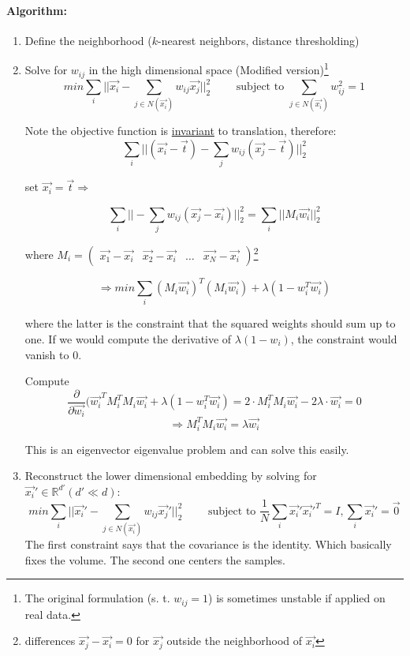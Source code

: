 \paragraph{Algorithm:}
\begin{enumerate}
    \item Define the neighborhood (\(k\)-nearest neighbors, distance thresholding)

    \item Solve for \(w_{ij}\) in the high dimensional space (Modified version)\footnote{The original formulation (s. t. $ w_{ij} = 1$) is sometimes unstable if applied on real data.}
        \[min \sum_{i}||\vec{x_i} - \sum_{j\in N(\vec{x_i})} w_{ij} \vec{x_j}||_2^2 \qquad \text{ subject to } \sum_{j \in N(\vec{x_i})} w_{ij}^2 = 1\]


        Note the objective function is \underline{invariant} to translation, therefore:
        \begin{equation*}
            \sum_{i} ||(\vec{x_i} - \vec{t}) - \sum_j w_{ij} (\vec{x_j} - \vec{t})||_2^2
        \end{equation*}

        set $\vec{x_i} = \vec{t} \Rightarrow$

        \begin{equation*}
            \sum_{i} ||- \sum_j w_{ij} (\vec{x_j} - \vec{x_i})||_2^2 = \sum_{i} ||M_i\vec{w_i}||_2^2
        \end{equation*}

        where $M_i = \left(\begin{array}{cccc} \vec{x_1} - \vec{x_i} & \vec{x_2} - \vec{x_i}& \dots& \vec{x_N} - \vec{x_i} \end{array}\right)$\footnote{differences \(\vec{x_j} - \vec{x_i} = 0\) for \(\vec{x_j}\) outside the neighborhood of \(\vec{x_i}\)}

        \[\Rightarrow min \sum_{i} (M_i \vec{w_i})^T (M_i \vec{w_i}) + \lambda(1-w_i^T \vec{w_i})\]

        where the latter is the constraint that the squared weights should sum up to one. If we would compute the derivative of \(\lambda(1-w_i)\), the constraint would vanish to \(0\).

        Compute
        \[\frac{\partial}{\partial \vec{w_i}} (\vec{w_i}^T M_i^T M_i \vec{w_i} + \lambda(1-w_i^T \vec{w_i})=  2 \cdot M_i^T M_i \vec{w_i} - 2 \lambda  \cdot \vec{w_i} = 0\]
        \[\Rightarrow \boxed{M_i^T M_i \vec{w_i} = \lambda \vec{w_i}}\]

        This is an eigenvector eigenvalue problem and can solve this easily.

    \item Reconstruct the lower dimensional embedding by solving for \(\vec{x_i}' \in \mathbb{R}^{d'} (d' \ll d)\):
        \[min \sum_i ||\vec{x_i}' - \sum_{j \in N(\vec{x_i})} w_{ij} \vec{x_j}'||_2^2 \qquad \text{ subject to } \frac{1}{N} \sum_i \vec{x_i}' \vec{x_i}'^T = I, \sum_i \vec{x_i}' = \vec{0}\]
        The first constraint says that the covariance is the identity. Which basically fixes the volume. The second one centers the samples.
\end{enumerate}
